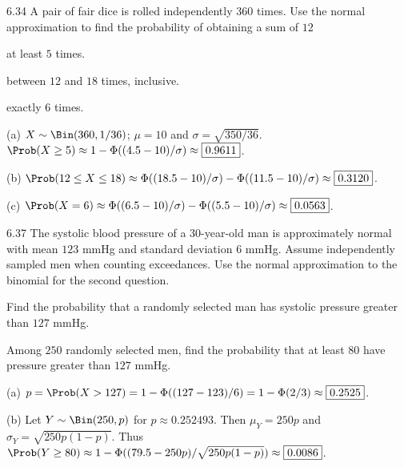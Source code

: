 \documentclass[11pt,oneside]{article}
\begin{document}
\begin{exercise}{6.34}
A pair of fair dice is rolled independently $360$ times. Use the normal approximation to find the probability of obtaining a sum of $12$
\begin{exercisesubparts}
\item at least $5$ times.
\item between $12$ and $18$ times, inclusive.
\item exactly $6$ times.
\end{exercisesubparts}
\end{exercise}

\begin{solution}
\noindent\textup{(a)} $X\sim\Bin(360,1/36)$; $\mu=10$ and $\sigma=\sqrt{350/36}$. $\Prob(X\ge5)\approx1-\Phi((4.5-10)/\sigma)\approx\boxed{0.9611}$.

\noindent\textup{(b)} $\Prob(12\le X\le18)\approx\Phi((18.5-10)/\sigma)-\Phi((11.5-10)/\sigma)\approx\boxed{0.3120}$.

\noindent\textup{(c)} $\Prob(X=6)\approx\Phi((6.5-10)/\sigma)-\Phi((5.5-10)/\sigma)\approx\boxed{0.0563}$.
\end{solution}

\begin{exercise}{6.37}
The systolic blood pressure of a $30$-year-old man is approximately normal with mean $123$ mmHg and standard deviation $6$ mmHg. Assume independently sampled men when counting exceedances. Use the normal approximation to the binomial for the second question.
\begin{exercisesubparts}
\item Find the probability that a randomly selected man has systolic pressure greater than $127$ mmHg.
\item Among $250$ randomly selected men, find the probability that at least $80$ have pressure greater than $127$ mmHg.
\end{exercisesubparts}
\end{exercise}

\begin{solution}
\noindent\textup{(a)} $p=\Prob(X>127)=1-\Phi((127-123)/6)=1-\Phi(2/3)\approx\boxed{0.2525}$.

\noindent\textup{(b)} Let $Y\sim\Bin(250,p)$ for $p\approx0.252493$. Then $\mu_Y=250p$ and $\sigma_Y=\sqrt{250p(1-p)}$. Thus $\Prob(Y\ge80)\approx1-\Phi((79.5-250p)/\sqrt{250p(1-p)})\approx\boxed{0.0086}$.
\end{solution}
\end{document}
